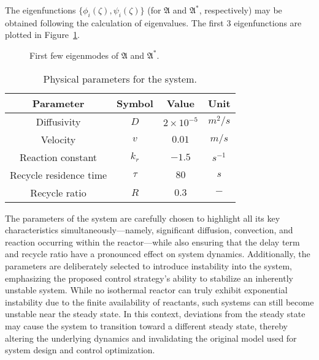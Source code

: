 The eigenfunctions $\{ {\phi_i}(\zeta), {\psi_i}(\zeta) \}$ (for $\mathfrak{A}$ and $\mathfrak{A}^*$, respectively) may be obtained following the calculation of eigenvalues. The first 3 eigenfunctions are plotted in Figure~\ref{fig:1_eigfun}. 

\begin{figure}[H]
    \centering
    
    \caption{First few eigenmodes of $\mathfrak{A}$ and $\mathfrak{A}^*$.}
    \label{fig:1_eigfun}
\end{figure}

\begin{table}[ht]
    \centering
    \caption{Physical parameters for the system.}
    \label{tab:1_pars}
    \begin{tabular}{|c|c|c|c|}
    \hline
    \textbf{Parameter}        & \textbf{Symbol} & \textbf{Value}     & \textbf{Unit}    \\ \hline
    Diffusivity               & $D$             & $2\times10^{-5}$   & ${m^2}/{s}$      \\ \hline
    Velocity                  & $v$             & $0.01$   & ${m}/{s}$        \\ \hline
    Reaction constant         & $k_r$           & $-1.5$              & $s^{-1}$         \\ \hline
    Recycle residence time    & $\tau$          & $80$               & $s$              \\ \hline
    Recycle ratio             & $R$             & $0.3$              & $-$              \\ \hline
    \end{tabular}
\end{table}

The parameters of the system are carefully chosen to highlight all its key characteristics simultaneously—namely, significant diffusion, convection, and reaction occurring within the reactor—while also ensuring that the delay term and recycle ratio have a pronounced effect on system dynamics. Additionally, the parameters are deliberately selected to introduce instability into the system, emphasizing the proposed control strategy's ability to stabilize an inherently unstable system. While no isothermal reactor can truly exhibit exponential instability due to the finite availability of reactants, such systems can still become unstable near the steady state. In this context, deviations from the steady state may cause the system to transition toward a different steady state, thereby altering the underlying dynamics and invalidating the original model used for system design and control optimization.

